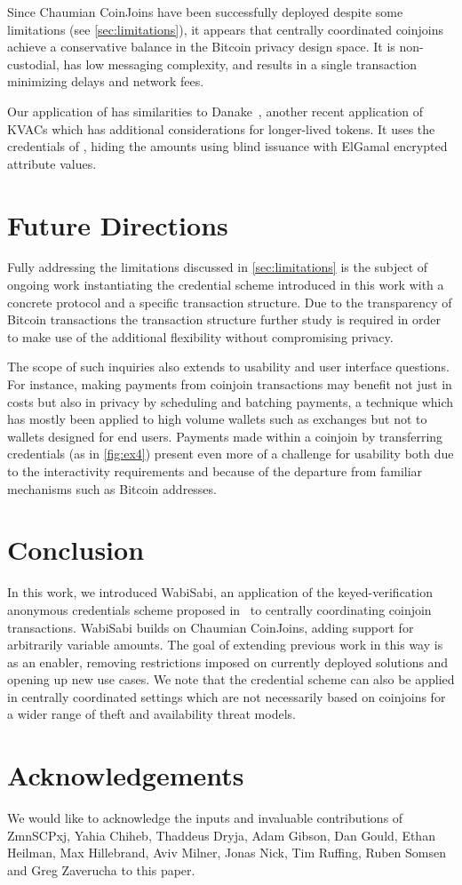 \documentclass[a4paper]{article}
\begin{document}
Since Chaumian CoinJoins have been successfully deployed despite some limitations (see \cref{sec:limitations}), it appears that centrally coordinated coinjoins achieve a conservative balance in the Bitcoin privacy design space. It is non-custodial, has low messaging complexity, and results in a single transaction minimizing delays and network fees.

Our application of \cite{chase2019signal} has similarities to Danake~\cite{devalence2020danake}, another recent application of KVACs which has additional considerations for longer-lived tokens. It uses the credentials of \cite{chase2014algebraic}, hiding the amounts using blind issuance with ElGamal encrypted attribute values.

\section{Future Directions} \label{sec:futuredirections}

Fully addressing the limitations discussed in \cref{sec:limitations} is the subject of ongoing work instantiating the credential scheme introduced in this work with a concrete protocol and a specific transaction structure. Due to the transparency of Bitcoin transactions the transaction structure further study is required in order to make use of the additional flexibility without compromising privacy.

The scope of such inquiries also extends to usability and user interface questions. For instance, making payments from coinjoin transactions may benefit not just in costs but also in privacy by scheduling and batching payments, a technique which has mostly been applied to high volume wallets such as exchanges but not to wallets designed for end users. Payments made within a coinjoin by transferring credentials (as in \cref{fig:ex4}) present even more of a challenge for usability both due to the interactivity requirements and because of the departure from familiar mechanisms such as Bitcoin addresses.

\section{Conclusion}\label{sec:conclusion}
In this work, we introduced WabiSabi, an application of the keyed-verification anonymous credentials scheme proposed in~\cite{chase2019signal} to centrally coordinating coinjoin transactions. WabiSabi builds on Chaumian CoinJoins, adding support for arbitrarily variable amounts. The goal of extending previous work in this way is as an enabler, removing restrictions imposed on currently deployed solutions and opening up new use cases. We note that the credential scheme can also be applied in centrally coordinated settings which are not necessarily based on coinjoins for a wider range of theft and availability threat models.

\section*{Acknowledgements}

We would like to acknowledge the inputs and invaluable contributions of ZmnSCPxj, Yahia Chiheb, Thaddeus Dryja, Adam Gibson, Dan Gould, Ethan Heilman, Max Hillebrand, Aviv Milner, Jonas Nick, Tim Ruffing, Ruben Somsen and Greg Zaverucha to this paper.
\printbibliography
\end{document}
